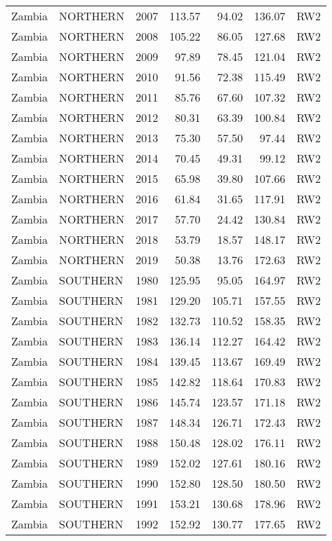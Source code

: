 \begin{longtable}{lllrrrl}
  Zambia & NORTHERN & 2007 & 113.57 & 94.02 & 136.07 & RW2 \\ 
  Zambia & NORTHERN & 2008 & 105.22 & 86.05 & 127.68 & RW2 \\ 
  Zambia & NORTHERN & 2009 & 97.89 & 78.45 & 121.04 & RW2 \\ 
  Zambia & NORTHERN & 2010 & 91.56 & 72.38 & 115.49 & RW2 \\ 
  Zambia & NORTHERN & 2011 & 85.76 & 67.60 & 107.32 & RW2 \\ 
  Zambia & NORTHERN & 2012 & 80.31 & 63.39 & 100.84 & RW2 \\ 
  Zambia & NORTHERN & 2013 & 75.30 & 57.50 & 97.44 & RW2 \\ 
  Zambia & NORTHERN & 2014 & 70.45 & 49.31 & 99.12 & RW2 \\ 
  Zambia & NORTHERN & 2015 & 65.98 & 39.80 & 107.66 & RW2 \\ 
  Zambia & NORTHERN & 2016 & 61.84 & 31.65 & 117.91 & RW2 \\ 
  Zambia & NORTHERN & 2017 & 57.70 & 24.42 & 130.84 & RW2 \\ 
  Zambia & NORTHERN & 2018 & 53.79 & 18.57 & 148.17 & RW2 \\ 
  Zambia & NORTHERN & 2019 & 50.38 & 13.76 & 172.63 & RW2 \\ 
  Zambia & SOUTHERN & 1980 & 125.95 & 95.05 & 164.97 & RW2 \\ 
  Zambia & SOUTHERN & 1981 & 129.20 & 105.71 & 157.55 & RW2 \\ 
  Zambia & SOUTHERN & 1982 & 132.73 & 110.52 & 158.35 & RW2 \\ 
  Zambia & SOUTHERN & 1983 & 136.14 & 112.27 & 164.42 & RW2 \\ 
  Zambia & SOUTHERN & 1984 & 139.45 & 113.67 & 169.49 & RW2 \\ 
  Zambia & SOUTHERN & 1985 & 142.82 & 118.64 & 170.83 & RW2 \\ 
  Zambia & SOUTHERN & 1986 & 145.74 & 123.57 & 171.18 & RW2 \\ 
  Zambia & SOUTHERN & 1987 & 148.34 & 126.71 & 172.43 & RW2 \\ 
  Zambia & SOUTHERN & 1988 & 150.48 & 128.02 & 176.11 & RW2 \\ 
  Zambia & SOUTHERN & 1989 & 152.02 & 127.61 & 180.16 & RW2 \\ 
  Zambia & SOUTHERN & 1990 & 152.80 & 128.50 & 180.50 & RW2 \\ 
  Zambia & SOUTHERN & 1991 & 153.21 & 130.68 & 178.96 & RW2 \\ 
  Zambia & SOUTHERN & 1992 & 152.92 & 130.77 & 177.65 & RW2 \\ 

\end{longtable}
